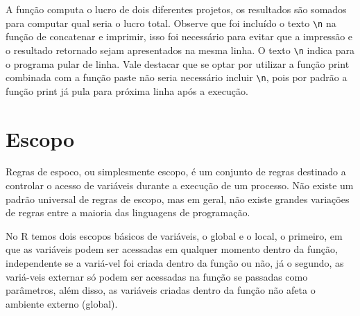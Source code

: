 \documentclass[
  11pt,
  a5paper,
  openany]{book}
\newenvironment{Shaded}{\begin{snugshade}}{\end{snugshade}}
\newcommand{\CharTok}[1]{\textcolor[rgb]{0.31,0.60,0.02}{#1}}
\newcommand{\CommentTok}[1]{\textcolor[rgb]{0.56,0.35,0.01}{\textit{#1}}}
\newcommand{\ControlFlowTok}[1]{\textcolor[rgb]{0.13,0.29,0.53}{\textbf{#1}}}
\newcommand{\DecValTok}[1]{\textcolor[rgb]{0.00,0.00,0.81}{#1}}
\newcommand{\KeywordTok}[1]{\textcolor[rgb]{0.13,0.29,0.53}{\textbf{#1}}}
\newcommand{\NormalTok}[1]{#1}
\newcommand{\OperatorTok}[1]{\textcolor[rgb]{0.81,0.36,0.00}{\textbf{#1}}}
\newcommand{\StringTok}[1]{\textcolor[rgb]{0.31,0.60,0.02}{#1}}
\begin{document}
\begin{Shaded}
\end{Shaded}

A função computa o lucro de dois diferentes projetos, os resultados são somados para computar qual seria o lucro total. Observe que foi incluído o texto \texttt{\textbackslash{}n} na função de concatenar e imprimir, isso foi necessário para evitar que a impressão e o resultado retornado sejam apresentados na mesma linha. O texto \texttt{\textbackslash{}n} indica para o programa pular de linha. Vale destacar que se optar por utilizar a função print combinada com a função paste não seria necessário incluir \texttt{\textbackslash{}n}, pois por padrão a função print já pula para próxima linha após a execução.

\hypertarget{escopo}{%
\section{Escopo}\label{escopo}}

Regras de espoco, ou simplesmente escopo, é um conjunto de regras destinado a controlar o acesso de variáveis durante a execução de um processo. Não existe um padrão universal de regras de escopo, mas em geral, não existe grandes variações de regras entre a maioria das linguagens de programação.

No R temos dois escopos básicos de variáveis, o global e o local, o primeiro, em que as variáveis podem ser acessadas em qualquer momento dentro da função, independente se a variá-vel foi criada dentro da função ou não, já o segundo, as variá-veis externar só podem ser acessadas na função se passadas como parâmetros, além disso, as variáveis criadas dentro da função não afeta o ambiente externo (global).
\end{document}

